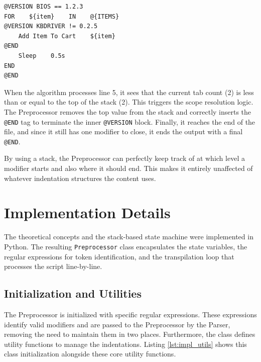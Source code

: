 \begin{lstlisting}[caption={Correct output of the problematic script with the final approach}, label={lst:problem_script_correct}]
@VERSION BIOS == 1.2.3
FOR    ${item}    IN    @{ITEMS}
@VERSION KBDRIVER != 0.2.5
    Add Item To Cart    ${item}
@END
    Sleep    0.5s
END
@END
\end{lstlisting}

When the algorithm processes line 5, it sees that the current tab count (2) is less than or equal to the top of the stack (2). This triggers the scope resolution logic. The Preprocessor removes the top value from the stack and correctly inserts the \texttt{@END} tag to terminate the inner \texttt{@VERSION} block. Finally, it reaches the end of the file, and since it still has one modifier to close, it ends the output with a final \texttt{@END}.

By using a stack, the Preprocessor can perfectly keep track of at which level a modifier starts and  also where it should end. This makes it entirely unaffected of whatever indentation structures the content uses.

\section{Implementation Details}


The theoretical concepts and the stack-based state machine were implemented in Python. The resulting \texttt{Preprocessor} class encapsulates the state variables, the regular expressions for token identification, and the transpilation loop that processes the script line-by-line. 


\subsection{Initialization and Utilities}


The Preprocessor is initialized with specific regular expressions. These expressions identify valid modifiers and are passed to the Preprocessor by the Parser, removing the need to maintain them in two places. Furthermore, the class defines utility functions to manage the indentations.
Listing \ref{lst:impl_utils} shows this class initialization alongside these core utility functions.


